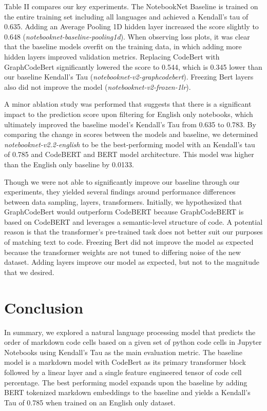 \documentclass[conference]{IEEEtran}
\begin{document}
Table II compares our key experiments. The NotebookNet Baseline is trained on the entire training set including all languages and achieved a Kendall’s tau of 0.635. Adding an Average Pooling 1D hidden layer increased the score slightly to 0.648 (\textit{notebooknet-baseline-pooling1d}). When observing loss plots, it was clear that the baseline models overfit on the training data, in which adding more hidden layers improved validation metrics. Replacing CodeBert with GraphCodeBert significantly lowered the score to 0.544, which is 0.345 lower than our baseline Kendall’s Tau (\textit{notebooknet-v2-graphcodebert}). Freezing Bert layers also did not improve the model (\textit{notebooknet-v2-frozen-1lr}).

A minor ablation study was performed that suggests that there is a significant impact to the prediction score upon filtering for English only notebooks, which ultimately improved the baseline model’s Kendall’s Tau from  0.635 to 0.783. By comparing the change in scores between the models and baseline, we determined \textit{notebooknet-v2.2-english} to be the best-performing model with an Kendall’s tau of 0.785 and CodeBERT and BERT model architecture. This model was higher than the English only baseline by 0.0133.

Though we were not able to significantly improve our baseline through our experiments, they yielded several findings around performance differences between data sampling, layers, transformers. Initially, we hypothesized that GraphCodeBert would outperform CodeBERT because GraphCodeBERT is based on CodeBERT and leverages a semantic-level structure of code. A potential reason is that the transformer’s pre-trained task does not better suit our purposes of matching text to code. Freezing Bert did not improve the model as expected because the transformer weights are not tuned to differing noise of the new dataset. Adding layers improve our model as expected, but not to the magnitude that we desired.

\section{Conclusion}
In summary, we explored a  natural language processing model that predicts the order of markdown code cells based on a given set of python code cells in Jupyter Notebooks using Kendall’s Tau as the main evaluation metric. The baseline model is a markdown model with CodeBert as its primary transformer block followed by a linear layer and a single feature engineered tensor of code cell percentage. The best performing model expands upon the baseline by adding BERT tokenized markdown embeddings to the baseline and yields a Kendall’s Tau of 0.785 when trained on an English only dataset.
\end{document}

